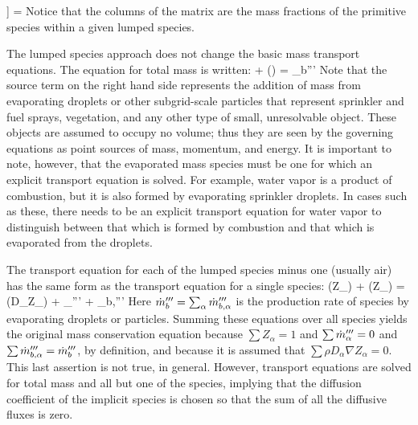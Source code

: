 \right]
\left[ \begin{array} {c} Z_A \\ Z_F \\ Z_P \end{array} \right] =
 \ee
Notice that the columns of the matrix are the mass fractions of the primitive species within a given lumped species.

The lumped species approach does not change the basic mass transport equations. The equation for total mass is written:
\be {} + \nabla\!\cdot (\rho \bu)  =  \dm_b'''  \label{mass} \ee
Note that the source term on the right hand side represents the addition of mass from evaporating droplets or other subgrid-scale
particles that represent sprinkler and fuel sprays, vegetation, and any other type of small, unresolvable object. These
objects are assumed to occupy no volume; thus they are seen by the governing equations as point sources of mass, momentum, and energy. It is important to
note, however, that the evaporated mass species must be one for which an explicit transport equation is solved. For example, water vapor is a product of
combustion, but it is also formed by evaporating sprinkler droplets. In cases such as these, there needs to be an explicit transport equation for water
vapor to distinguish between that which is formed by combustion and that which is evaporated from the droplets.

The transport equation for each of the lumped species minus one (usually air) has the same form as the transport equation for a single species:
\be {}(\rho Z_\alpha) + \nabla\!\cdot (\rho Z_\alpha \bu) = \nabla\!\cdot (\rho D_\alpha \nabla Z_\alpha) + \dm_\alpha''' + \dm_{b,\alpha}''' \label{species} \ee
Here $\dot{m}_b'''=\sum_\alpha \dot{m}_{b,\alpha}'''$ is the production rate of species by evaporating droplets or particles.
Summing these equations over all species yields the original mass conservation equation because
$\sum Z_\alpha=1$ and $\sum \dot{m}_\alpha''' = 0$ and $\sum \dot{m}_{b,\alpha}'''=\dot{m}_b'''$, by definition, and because it is assumed
that $\sum \rho D_\alpha \nabla Z_\alpha = 0$. This last assertion is not true, in general.
However, transport equations are solved for total
mass and all but one of the species, implying that the diffusion coefficient of the implicit species is
chosen so that the sum of all the diffusive fluxes is zero.

